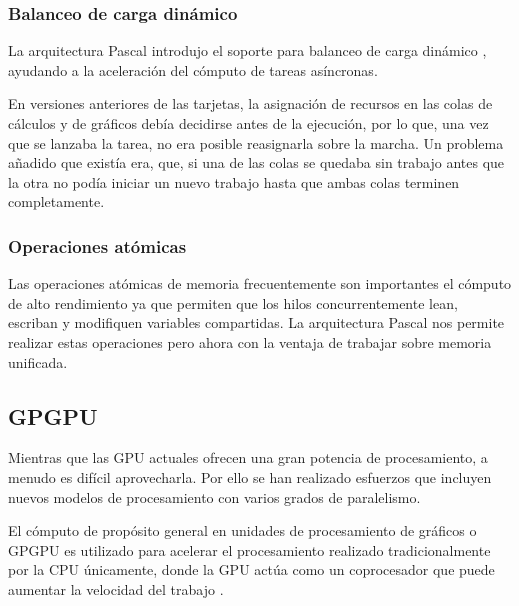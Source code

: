     \subsubsection{Balanceo de carga dinámico}
        La arquitectura Pascal introdujo el soporte para balanceo de carga dinámico \cite{AnPasc},  ayudando a la aceleración del cómputo de tareas asíncronas.
        
        \vspace{0.3cm}
    En versiones anteriores de las tarjetas, la asignación de recursos en las colas de cálculos y de gráficos debía decidirse antes de la ejecución, por lo que, una vez que se lanzaba la tarea, no era posible reasignarla sobre la marcha. Un problema añadido que existía era, que, si una de las colas se quedaba sin trabajo antes que la otra no podía iniciar un nuevo trabajo hasta que ambas colas terminen completamente\cite{PasAna}.
    
    \subsubsection{Operaciones atómicas} 
    Las operaciones atómicas de memoria frecuentemente son importantes el cómputo de alto rendimiento ya que permiten que los hilos concurrentemente lean, escriban y modifiquen variables compartidas. La arquitectura Pascal nos permite realizar estas operaciones pero ahora con la ventaja de trabajar sobre memoria unificada.

    \subsection{GPGPU}
    
    Mientras que las GPU actuales ofrecen una gran potencia de procesamiento, a menudo es difícil aprovecharla. Por ello se han realizado esfuerzos que incluyen nuevos modelos de procesamiento con varios grados de paralelismo.
    
    El cómputo de propósito general en unidades de procesamiento de gráficos o GPGPU es utilizado para acelerar el procesamiento realizado tradicionalmente por la CPU únicamente, donde la GPU actúa como un coprocesador que puede aumentar la velocidad del trabajo \cite{GpuCpu}.

